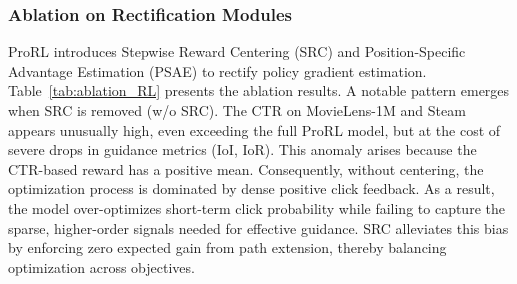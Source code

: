 \documentclass{llmxive}
\begin{document}
\subsubsection{Ablation on Rectification Modules}
\label{sec:ablation_component}
ProRL introduces Stepwise Reward Centering (SRC) and Position-Specific Advantage Estimation (PSAE) to rectify policy gradient estimation. Table~\ref{tab:ablation_RL} presents the ablation results. A notable pattern emerges when SRC is removed (w/o SRC). The CTR on MovieLens-1M and Steam appears unusually high, even exceeding the full ProRL model, but at the cost of severe drops in guidance metrics (IoI, IoR). This anomaly arises because the CTR-based reward has a positive mean. Consequently, without centering, the optimization process is dominated by dense positive click feedback. As a result, the model over-optimizes short-term click probability while failing to capture the sparse, higher-order signals needed for effective guidance. SRC alleviates this bias by enforcing zero expected gain from path extension, thereby balancing optimization across objectives.

\begin{table}[t]
  \centering
\caption{Ablation Studies on ProRL}
\label{tab:ablation_RL}
\end{table}
\end{document}
